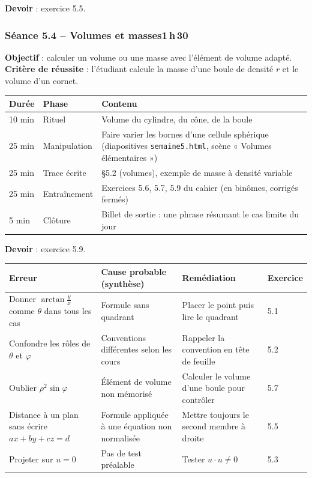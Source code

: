 \documentclass[10.5pt,a4paper]{article}
\newif\ifprof
\newcommand{\synth}{\textsf{\textcolor{ardoise}{(synthèse)}}}
\newcommand{\profonly}[1]{\ifprof #1\fi}
\begin{document}
\textbf{Devoir} : exercice 5.5.\profonly{ \textbf{Point de vigilance} : Vérifier $u\ne0$ avant de projeter ; écrire le plan sous la forme $ax+by+cz=d$.}\par
{}\subsubsection*{\textcolor{marine}{Séance 5.4 -- Volumes et masses}\hfill\normalfont\small\textcolor{ardoise}{1\,h\,30}}
\begin{objectif}\textbf{Objectif} : calculer un volume ou une masse avec l'élément de volume adapté.\\\textbf{Critère de réussite} : l'étudiant calcule la masse d'une boule de densité $r$ et le volume d'un cornet.\end{objectif}\nopagebreak
\begin{longtable}{@{}p{1.1cm}p{2.4cm}p{12.4cm}@{}}
\toprule \textbf{Durée} & \textbf{Phase} & \textbf{Contenu}\\ \midrule\endhead
10 min & Rituel & Volume du cylindre, du cône, de la boule\\
25 min & Manipulation & Faire varier les bornes d'une cellule sphérique (diapositives \texttt{semaine5.html}, scène « Volumes élémentaires »)\\
25 min & Trace écrite & \S5.2 (volumes), exemple de masse à densité variable\\
25 min & Entraînement & Exercices 5.6, 5.7, 5.9 du cahier (en binômes, corrigés fermés)\\
5 min & Clôture & Billet de sortie : une phrase résumant le cas limite du jour\\ \bottomrule\end{longtable}\nopagebreak
\textbf{Devoir} : exercice 5.9.\profonly{ \textbf{Point de vigilance} : Facteur $r$ ou $\rho^2\sin\varphi$ souvent oublié.}\par
\ifprof
\begin{longtable}{@{}p{4.8cm}p{3.6cm}p{4.9cm}p{1.6cm}@{}}
\toprule \textbf{Erreur} & \textbf{Cause probable \synth} & \textbf{Remédiation} & \textbf{Exercice}\\ \midrule\endhead
Donner $\arctan\frac yx$ comme $\theta$ dans tous les cas & Formule sans quadrant & Placer le point puis lire le quadrant & 5.1\\
Confondre les rôles de $\theta$ et $\varphi$ & Conventions différentes selon les cours & Rappeler la convention en tête de feuille & 5.2\\
Oublier $\rho^2\sin\varphi$ & Élément de volume non mémorisé & Calculer le volume d'une boule pour contrôler & 5.7\\
Distance à un plan sans écrire $ax+by+cz=d$ & Formule appliquée à une équation non normalisée & Mettre toujours le second membre à droite & 5.5\\
Projeter sur $u=0$ & Pas de test préalable & Tester $u\cdot u\ne0$ & 5.3\\
\bottomrule\end{longtable}
\end{document}
